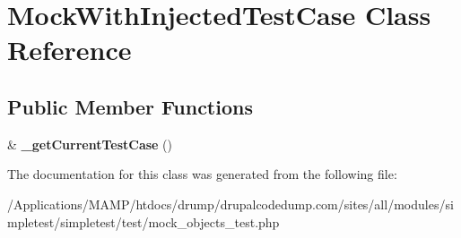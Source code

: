 \hypertarget{class_mock_with_injected_test_case}{
\section{MockWithInjectedTestCase Class Reference}
\label{class_mock_with_injected_test_case}
}
\subsection*{Public Member Functions}
\begin{DoxyCompactItemize}
\item 
\hypertarget{class_mock_with_injected_test_case_adfe50765bcf7b67f9c23322b2c2e8af9}{
\& {\bfseries \_\-getCurrentTestCase} ()}
\label{class_mock_with_injected_test_case_adfe50765bcf7b67f9c23322b2c2e8af9}

\end{DoxyCompactItemize}


The documentation for this class was generated from the following file:\begin{DoxyCompactItemize}
\item 
/Applications/MAMP/htdocs/drump/drupalcodedump.com/sites/all/modules/simpletest/simpletest/test/mock\_\-objects\_\-test.php\end{DoxyCompactItemize}

